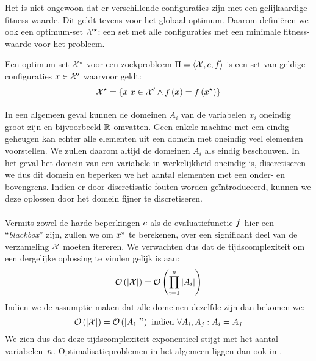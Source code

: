 Het is niet ongewoon dat er verschillende configuraties zijn met een gelijkaardige fitness-waarde. Dit geldt tevens voor het globaal optimum. Daarom defini\"eren we ook een optimum-set $\mathcal{X}^{\star}$: een set met alle configuraties met een minimale fitness-waarde voor het probleem.

\begin{definition}
Een optimum-set $\mathcal{X}^{\star}$ voor een zoekprobleem $\Pi=\left\langle \mathcal{X},c,f\right\rangle$ is een set van geldige configuraties $x\in\mathcal{X}'$ waarvoor geldt:
\begin{equation}
\mathcal{X}^{\star}=\left\{ x|x\in\mathcal{X}'\wedge f\left(x\right)=f\left(x^{\star}\right)\right\}
\end{equation}
\end{definition}

\paragraph{}
In een algemeen geval kunnen de domeinen $A_i$ van de variabelen $x_i$ oneindig groot zijn en bijvoorbeeld $\mathbb{R}$ omvatten. Geen enkele machine met een eindig geheugen kan echter alle elementen uit een domein met oneindig veel elementen voorstellen. We zullen daarom altijd de domeinen $A_i$ als eindig beschouwen. In het geval het domein van een variabele in werkelijkheid oneindig is, discretiseren we dus dit domein en beperken we het aantal elementen met een onder- en bovengrens. Indien er door discretisatie fouten worden ge\"introduceerd, kunnen we deze oplossen door het domein fijner te discretiseren.
\paragraph{}
Vermits zowel de harde beperkingen $c$ als de evaluatiefunctie $f$ hier een ``\emph{blackbox}'' zijn, zullen we om $x^{\star}$ te berekenen, over een significant deel van de verzameling $\mathcal{X}$ moeten itereren. We verwachten dus dat de tijdscomplexiteit om een dergelijke oplossing te vinden gelijk is aan:
\begin{equation}
\mathcal{O}\left(\left| \mathcal{X}\right|\right)=\mathcal{O}\left(\displaystyle\prod_{i=1}^n\left| A_i\right|\right)
\end{equation}
Indien we de assumptie maken dat alle domeinen dezelfde zijn dan bekomen we:
\begin{equation}
\mathcal{O}\left(\left| \mathcal{X}\right|\right)=\mathcal{O}\left(\left| A_1\right|^n\right)\mbox{ indien }\forall A_i,A_j: A_i=A_j
\end{equation}
We zien dus dat deze tijdscomplexiteit exponentieel stijgt met het aantal variabelen~$n$. Optimalisatieproblemen in het algemeen liggen dan ook in .

